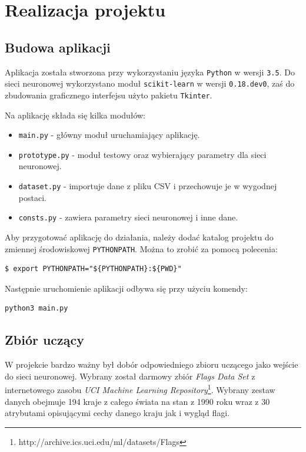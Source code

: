 \chapter{Realizacja projektu}

\section{Budowa aplikacji}

Aplikacja została stworzona przy wykorzystaniu języka \texttt{Python} w wersji \texttt{3.5}. Do sieci neuronowej wykorzystano moduł \texttt{scikit-learn} w wersji  \texttt{0.18.dev0}, zaś do zbudowania graficznego interfejsu użyto pakietu \texttt{Tkinter}.

Na aplikację składa się kilka modułów:

\begin{itemize}
    \item \texttt{main.py} - główny moduł uruchamiający aplikację.
    \item \texttt{prototype.py} - moduł testowy oraz wybierający parametry dla sieci neuronowej.
    \item \texttt{dataset.py} - importuje dane z pliku CSV i przechowuje je w wygodnej postaci.
    \item \texttt{consts.py} - zawiera parametry sieci neuronowej i inne dane.
\end{itemize}


Aby przygotować aplikację do działania, należy dodać katalog projektu do zmiennej środowiskowej \texttt{PYTHONPATH}. Można to zrobić za pomocą polecenia:

\begin{verbatim}
$ export PYTHONPATH="${PYTHONPATH}:${PWD}"
\end{verbatim}

Następnie uruchomienie aplikacji odbywa się przy użyciu komendy:

\begin{verbatim}
python3 main.py
\end{verbatim}

\newpage

\section{Zbiór uczący}
\label{zbior}

W projekcie bardzo ważny był dobór odpowiedniego zbioru uczącego jako wejście do sieci neuronowej. Wybrany został darmowy zbiór \textit{Flags Data Set} z internetowego zasobu \textit{UCI Machine Learning Repository}\footnote{http://archive.ics.uci.edu/ml/datasets/Flags}. Wybrany zestaw danych obejmuje 194 kraje z całego świata na stan z 1990 roku wraz z 30 atrybutami opisującymi cechy danego kraju jak i wygląd flagi.


